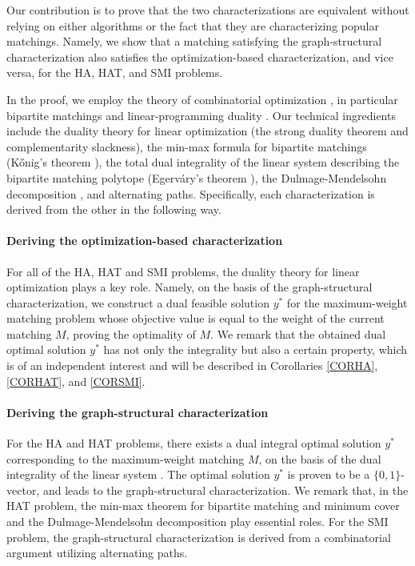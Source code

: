 \documentclass[11pt,a4paper,showkeys]{article}
\theoremstyle{plain}
\theoremstyle{definition}
\begin{document}
Our contribution is to prove that the two characterizations are equivalent 
without relying on either algorithms or the fact that they are characterizing popular matchings. 
Namely, 
we show that a matching satisfying the graph-structural characterization 
also satisfies the optimization-based characterization, 
and vice versa, 
for the HA, HAT, and SMI problems. 

In the proof, 
we employ the theory of combinatorial optimization \cite{KV18,Sch03},  
in particular bipartite matchings \cite{LP86} and linear-programming duality \cite{Sch86}. 
Our technical ingredients include 
the duality theory for linear optimization (the strong duality theorem and complementarity slackness), 
the min-max formula for bipartite matchings (K\H{o}nig's theorem \cite{Kon31}), 
the total dual integrality of the linear system 
describing the bipartite matching polytope (Egerv\'ary's theorem \cite{Ege31}), 
the Dulmage-Mendelsohn decomposition \cite{DM58,DM59}, 
and 
alternating paths. 
Specifically, 
each characterization is derived from the other in the following way. 

\paragraph{Deriving the optimization-based characterization}
For all of the HA, HAT and SMI problems, 
the duality theory for linear optimization plays a key role. 
Namely, 
on the basis of the graph-structural characterization, 
we construct a dual feasible solution $y^*$ for the maximum-weight matching problem 
whose objective value is equal to the weight of the current matching $M$, 
proving the optimality of $M$. 
We remark that the obtained dual optimal solution $y^*$ has not only the integrality but also a certain property, 
which is of an independent interest and will be described in Corollaries \ref{CORHA}, \ref{CORHAT}, and \ref{CORSMI}. 

\paragraph{Deriving the graph-structural characterization}
For the HA and HAT problems, 
there exists a dual integral optimal solution $y^*$ corresponding to the maximum-weight matching $M$, 
on the basis of 
the dual integrality of the linear system \cite{Ege31}. 
The optimal solution $y^*$ is proven to be a $\{0,1\}$-vector, 
and leads to the graph-structural characterization. 
We remark that, 
in the HAT problem, 
the min-max theorem for bipartite matching and minimum cover \cite{Kon31} and 
the Dulmage-Mendelsohn decomposition \cite{DM58,DM59} play essential roles. 
For the SMI problem, 
the graph-structural characterization is derived from a combinatorial argument utilizing alternating paths. 
\end{document}
